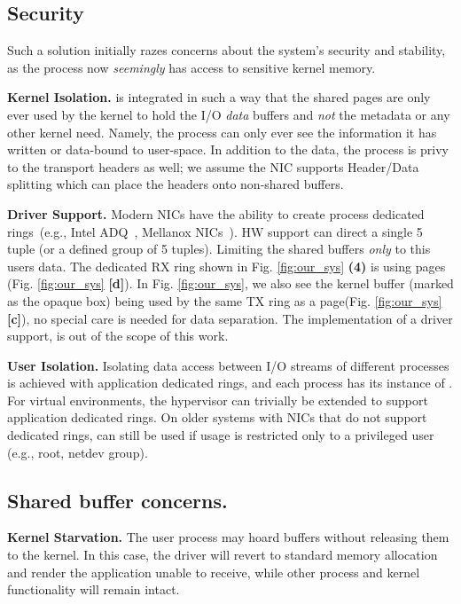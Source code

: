 

\subsection{Security}
Such a solution initially razes concerns about the system's security and stability, as the process now \emph{seemingly} has access to sensitive kernel memory. 

\noindent\textbf{Kernel Isolation.} \oursys is integrated in such a way that the shared pages are only ever used by the kernel to hold the I/O \emph{data} buffers and \emph{not} the metadata or any other kernel need. Namely, the process can only ever see the information it has written or data-bound to user-space. In addition to the data, the process is privy to the transport headers as well; we assume the NIC supports Header/Data splitting\cite{hds} which can place the headers onto non-shared buffers.

\noindent\textbf{Driver Support.} Modern NICs have the ability to create process dedicated rings~(e.g., Intel ADQ~\cite{adq}, Mellanox NICs~\cite{bifurcate}). HW support\cite{flow_direct} can direct a single 5 tuple (or a defined group of 5 tuples). Limiting the shared buffers \emph{only} to this users data. The dedicated RX ring shown in Fig. \ref{fig:our_sys} \textbf{(4)} is using \oursys pages (Fig. \ref{fig:our_sys} \textbf{[d]}). In Fig. \ref{fig:our_sys}, we also see the kernel buffer (marked as the opaque box) being used by the same TX ring as a \oursys page(Fig. \ref{fig:our_sys} \textbf{[c]}), no special care is needed for data separation. The implementation of a driver support, is out of the scope of this work. 

\noindent\textbf{User Isolation.} Isolating data access between I/O streams of different processes is achieved with application dedicated rings, and each process has its instance of \oursys. For virtual environments, the hypervisor can trivially be extended to support application dedicated rings. On older systems with NICs that do not support dedicated rings, \oursys can still be used if usage is restricted only to a privileged user (e.g., root, netdev group).    

\subsection{Shared buffer concerns.}
\noindent\textbf{Kernel Starvation.} The user process may hoard \oursys buffers without releasing them to the kernel.
In this case, the driver will revert to standard memory allocation and render the application unable to receive, while other process and kernel functionality will remain intact.


